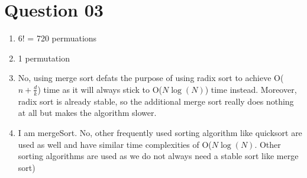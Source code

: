 \documentclass{article}
\begin{document}
\section{Question 03}
\begin{enumerate}[label=(\alph*)]

\item 6! = 720 permuations

\item 1 permutation

\item No, using merge sort defats the purpose of using radix sort to achieve O($n + \frac{d}{k}$) time as it will always stick to O($N\log(N)$) time instead. Moreover, radix sort is already stable, so the additional merge sort really does nothing at all but makes the algorithm slower.

\item I am mergeSort. No, other frequently used sorting algorithm like quicksort are used as well and have similar time complexities of O($N\log(N)$. Other sorting algorithms are used as we do not always need a stable sort like merge sort)
\end{enumerate}
\end{document}
